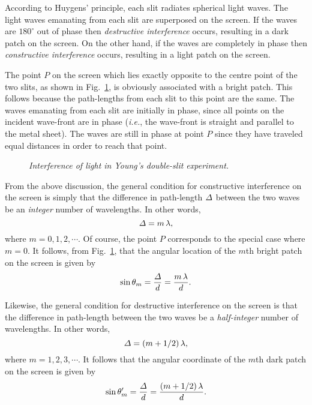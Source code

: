 According to Huygens' principle, each slit radiates spherical light waves.
The light waves emanating from each slit are superposed on the screen. If
the waves are $180^\circ$ out of phase then {\em destructive interference}\/
occurs, resulting in a dark patch on the screen. On the other hand,
if the waves are completely in phase then {\em constructive interference}\/
occurs, resulting in a light patch on the screen.

The point $P$ on the screen which lies exactly opposite to the centre point
of the
two slits, as shown in Fig.~\ref{f14.5}, is obviously associated with
a bright patch. This follows because the path-lengths from each slit to
this point are the same. The waves emanating from each slit are initially
in phase, since all points on the incident wave-front are in phase ({\em i.e.},
the wave-front is straight and parallel to the metal sheet).
The
waves are still in phase at point $P$ since they have
traveled equal distances in order to reach that point.

\begin{figure}
\epsfysize=3in
\centerline{}
\caption{\em Interference of light in Young's double-slit experiment.}\label{f14.5}
\end{figure}

From the above discussion, the general condition for constructive interference
on the screen 
is simply that the difference in path-length ${\mit\Delta}$ between
the two waves be an {\em integer}\/ number of wavelengths. In other words,
\begin{equation}
{\mit\Delta} = m\,\lambda,
\end{equation}
where $m=0,1,2,\cdots$. Of course, the point $P$ corresponds to the special
case where $m=0$. It follows, from Fig.~\ref{f14.5}, that the angular
location  of the $m$th bright patch on the screen is given by
\begin{equation}
\sin\theta_m = \frac{\mit\Delta}{d} = \frac{m\,\lambda}{d}.
\end{equation}

Likewise, the general condition for destructive interference 
on the screen is that
the difference in path-length between the two waves be a {\em half-integer}\/ 
number of wavelengths. In other words,
\begin{equation}
{\mit\Delta} = (m+1/2)\,\lambda,
\end{equation}
where $m=1,2,3,\cdots$. It follows that the angular coordinate of the
$m$th dark patch on the screen is given by
\begin{equation}
\sin\theta_m' = \frac{\mit\Delta}{d} = \frac{(m+1/2)\,\lambda}{d}.
\end{equation}

